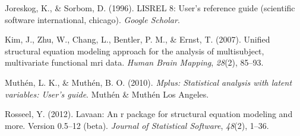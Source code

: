 \documentclass[jou]{apa6}
\theoremstyle{definition}
\theoremstyle{definition}
\theoremstyle{definition}
\theoremstyle{remark}
\begin{document}
\leavevmode\hypertarget{ref-joreskog1996lisrel}{}%
Joreskog, K., \& Sorbom, D. (1996). LISREL 8: User's reference guide
(scientific software international, chicago). \emph{Google Scholar}.

\leavevmode\hypertarget{ref-kim2007unified}{}%
Kim, J., Zhu, W., Chang, L., Bentler, P. M., \& Ernst, T. (2007).
Unified structural equation modeling approach for the analysis of
multisubject, multivariate functional mri data. \emph{Human Brain
Mapping}, \emph{28}(2), 85--93.

\leavevmode\hypertarget{ref-muthen2010mplus}{}%
Muthén, L. K., \& Muthén, B. O. (2010). \emph{Mplus: Statistical
analysis with latent variables: User's guide}. Muthén \& Muthén Los
Angeles.

\leavevmode\hypertarget{ref-rosseel2012lavaan}{}%
Rosseel, Y. (2012). Lavaan: An r package for structural equation
modeling and more. Version 0.5--12 (beta). \emph{Journal of Statistical
Software}, \emph{48}(2), 1--36.
\end{document}
